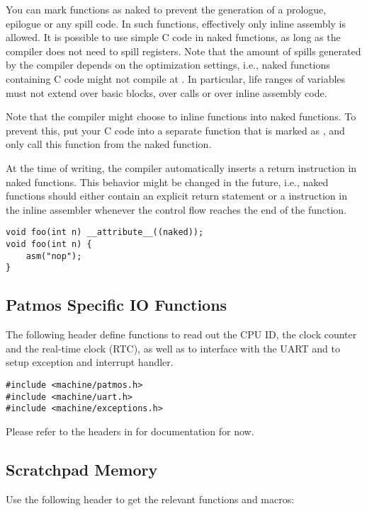 You can mark functions as naked to prevent the generation of a prologue, epilogue or any spill code.
In such functions, effectively only inline assembly is allowed. It is possible to use simple C code in naked 
functions, as long as the compiler does not need to spill registers. Note that the amount of spills generated by
the compiler depends on the optimization settings, i.e., naked functions containing C code might not compile at
. In particular, life ranges of variables must not extend over basic blocks, over calls or over
inline assembly code.

Note that the compiler might choose to inline functions into naked functions. To prevent this, put your C code into a
separate function that is marked as , and only call this function from the naked function.

At the time of writing, the compiler automatically inserts a return instruction in naked functions. This behavior might be changed
in the future, i.e., naked functions should either contain an explicit return statement or a  instruction in
the inline assembler whenever the control flow reaches the end of the function.

\begin{verbatim}
void foo(int n) __attribute__((naked));
void foo(int n) {
    asm("nop");
}
\end{verbatim}


\subsection{Patmos Specific IO Functions}

The following header define functions to read out the CPU ID, the clock counter and the real-time clock (RTC), as well as to
interface with the UART and to setup exception and interrupt handler.

\begin{verbatim}
#include <machine/patmos.h>
#include <machine/uart.h>
#include <machine/exceptions.h>
\end{verbatim}

Please refer to the headers in  for documentation for now.


\subsection{Scratchpad Memory}

Use the following header to get the relevant functions and macros:

